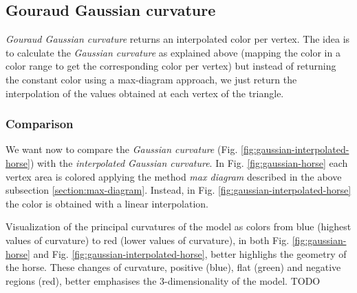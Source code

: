 \subsection{Gouraud Gaussian curvature}
\textit{Gouraud Gaussian curvature} returns an interpolated color per vertex. The idea is to calculate the \textit{Gaussian curvature} as explained above (mapping the color in a color range to get the corresponding color per vertex) but instead of returning the constant color using a max-diagram approach, we just return the interpolation of the values obtained at each vertex of the triangle.


\subsubsection{Comparison}
We want now to compare the \textit{Gaussian curvature} (Fig. \ref{fig:gaussian-interpolated-horse}) with the \textit{interpolated Gaussian curvature}. In Fig. \ref{fig:gaussian-horse} each vertex area is colored applying the method \textit{max diagram} described in the above subsection \ref{section:max-diagram}. Instead, in Fig. \ref{fig:gaussian-interpolated-horse} the color is obtained with a linear interpolation.

Visualization of the principal curvatures of the model as colors from blue (highest values of curvature) to red (lower values of curvature), in both Fig. \ref{fig:gaussian-horse} and Fig. \ref{fig:gaussian-interpolated-horse}, better highlighs the geometry of the horse.
These changes of curvature, positive (blue), flat (green) and negative regions (red), better emphasises the 3-dimensionality of the model.
TODO
